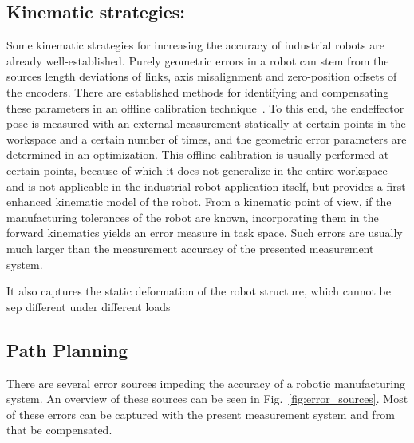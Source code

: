 \documentclass[5p,times,procedia]{elsarticle}
\begin{document}
\subsection{Kinematic strategies:}
Some kinematic strategies for increasing the accuracy of industrial robots are already well-established.
Purely geometric errors in a robot can stem from the sources length deviations of links, axis misalignment and zero-position offsets of the encoders.
There are established methods for identifying and compensating these parameters in an offline calibration technique~\cite{Wiest01}.
To this end, the endeffector pose is measured with an external measurement statically at certain points in the workspace and a certain number of times, and the geometric error parameters are determined in an optimization.
This offline calibration is usually performed at certain points, because of which it does not generalize in the entire workspace and is not applicable in the industrial robot application itself, but provides a first enhanced kinematic model of the robot.
From a kinematic point of view, if the manufacturing tolerances of the robot are known, incorporating them in the forward kinematics yields an error measure in task space. Such errors are usually much larger than the measurement accuracy of the presented measurement system.

It also captures the static deformation of the robot structure, which cannot be sep
different under different loads 

\subsection{Path Planning}
There are several error sources impeding the accuracy of a robotic manufacturing system.
An overview of these sources can be seen in Fig.~\ref{fig:error_sources}.
Most of these errors can be captured with the present measurement system and from that be compensated.
\end{document}
